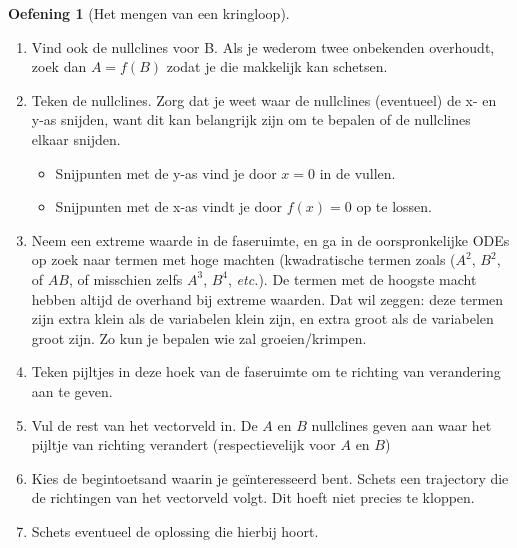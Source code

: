 \documentclass[
  a4paper,
]{scrbook}
\providecommand{\tightlist}{%
  \setlength{\itemsep}{0pt}\setlength{\parskip}{0pt}}\usepackage{longtable,booktabs,array}
\theoremstyle{definition}
\newtheorem{exercise}{Oefening}[chapter]
\theoremstyle{remark}
\begin{document}
\begin{exercise}[Het mengen van een
kringloop]
\begin{tcolorbox}
\begin{enumerate}
  \begin{itemize}
  \tightlist
  \item
    \(A=0\), wat gebeurt als elke term \(A\) bevat. Voor groeimodellen
    komt deze nullcline vaak (maar niet altijd!) voor.
  \item
    \(A=C\), een \emph{horizontale} lijn bij een niet-triviale
    hoeveelheid \(A\).
  \item
    \(B=C\), een \emph{verticale} lijn bij een niet-triviale hoeveelheid
    \(B\).
  \item
    \(A=f(B)\) of \(B=f(A)\), wat gebeurt als je beide onbekenden (\(A\)
    en \(B\)) overhoudt. In dit geval is het vaak makkelijk om de zoeken
    naar een functie die in je assenstelsel een functie y=f(x) geeft. In
    dit geval is dus \(A=f(B)\) prettiger, want we hadden ervoor gekozen
    \(A\) op de y-as te zetten.
  \end{itemize}
\item
  Vind ook de nullclines voor B. Als je wederom twee onbekenden
  overhoudt, zoek dan \(A=f(B)\) zodat je die makkelijk kan schetsen.
\item
  Teken de nullclines. Zorg dat je weet waar de nullclines (eventueel)
  de x- en y-as snijden, want dit kan belangrijk zijn om te bepalen of
  de nullclines elkaar snijden.

  \begin{itemize}
  \tightlist
  \item
    Snijpunten met de y-as vind je door \(x=0\) in de vullen.
  \item
    Snijpunten met de x-as vindt je door \(f(x)=0\) op te lossen.
  \end{itemize}
\item
  Neem een extreme waarde in de faseruimte, en ga in de oorspronkelijke
  ODEs op zoek naar termen met hoge machten (kwadratische termen zoals
  (\(A^2\), \(B^2\), of \(AB\), of misschien zelfs \(A^3\), \(B^4\),
  \emph{etc.}). De termen met de hoogste macht hebben altijd de overhand
  bij extreme waarden. Dat wil zeggen: deze termen zijn extra klein als
  de variabelen klein zijn, en extra groot als de variabelen groot zijn.
  Zo kun je bepalen wie zal groeien/krimpen.
\item
  Teken pijltjes in deze hoek van de faseruimte om te richting van
  verandering aan te geven.
\item
  Vul de rest van het vectorveld in. De \(A\) en \(B\) nullclines geven
  aan waar het pijltje van richting verandert (respectievelijk voor
  \(A\) en \(B\))
\item
  Kies de begintoetsand waarin je geïnteresseerd bent. Schets een
  trajectory die de richtingen van het vectorveld volgt. Dit hoeft niet
  precies te kloppen.
\item
  Schets eventueel de oplossing die hierbij hoort.
\end{enumerate}


\end{tcolorbox}
\end{exercise}
\end{document}
